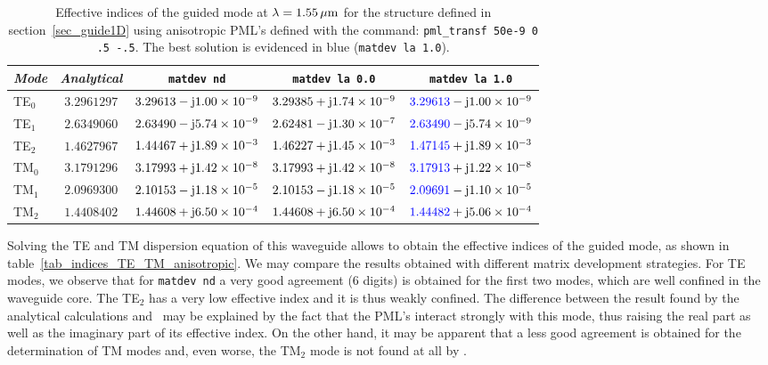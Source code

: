 \begin{table}
{\scriptsize
\begin{tabular}{lcccc}
\hline
\textit{Mode}   & \textit{Analytical}   & \lstinline!matdev nd! & \lstinline!matdev la 0.0! & \lstinline!matdev la 1.0! \\
\hline
TE$_0$ & $3.2961297$ & $3.29613-\mathrm{j} 1.00\times 10^{-9}$ & $3.29385+\mathrm{j} 1.74\times 10^{-9}$ & ${\color{blue}3.29613}-\mathrm{j} 1.00\times 10^{-9}$ \\
TE$_1$ & $2.6349060$ & $2.63490-\mathrm{j} 5.74\times 10^{-9}$ & $2.62481-\mathrm{j} 1.30\times 10^{-7}$ & ${\color{blue}2.63490}-\mathrm{j} 5.74\times 10^{-9}$ \\
TE$_2$ & $1.4627967$ & $1.44467+\mathrm{j} 1.89\times 10^{-3}$ & $1.46227+\mathrm{j} 1.45\times 10^{-3}$ & ${\color{blue}1.47145}+\mathrm{j} 1.89\times 10^{-3}$ \\
\hline
TM$_0$ & $3.1791296$ & $3.17993+\mathrm{j} 1.42\times 10^{-8}$ & $3.17993+\mathrm{j} 1.42\times 10^{-8}$ & ${\color{blue}3.17913}+\mathrm{j} 1.22\times 10^{-8}$ \\
TM$_1$ & $2.0969300$ & $2.10153-\mathrm{j} 1.18\times 10^{-5}$ & $2.10153-\mathrm{j} 1.18\times 10^{-5}$ & ${\color{blue}2.09691}-\mathrm{j} 1.10\times 10^{-5}$ \\
TM$_2$ & $1.4408402$ & $1.44608+\mathrm{j} 6.50\times 10^{-4}$  & $1.44608+\mathrm{j} 6.50\times 10^{-4}$ & ${\color{blue}1.44482}+\mathrm{j} 5.06\times 10^{-4}$ \\
\hline
\end{tabular}}
\caption{Effective indices of the guided mode at $\lambda=1.55\,\mathrm{\mu m}$ for the structure defined in section~\ref{sec_guide1D} using anisotropic PML's defined with the command: \lstinline!pml_transf 50e-9 0 .5 -.5!. The best solution is evidenced in blue (\lstinline!matdev la 1.0!).}
\label{tab_indices_TE_TM_transform}
\end{table}

Solving the TE and TM dispersion equation of this waveguide allows to obtain the effective indices of the guided mode, as shown in table~\ref{tab_indices_TE_TM_anisotropic}.
We may compare the results obtained with different matrix development strategies. For TE modes, we observe that for \lstinline!matdev nd!  a very good agreement (6 digits) is obtained for the first two modes, which are well confined in the waveguide core. The TE$_2$ has a very low effective index and it is thus weakly confined. The difference between the result found by the analytical calculations and \afmm\ may be explained by the fact that the PML's interact strongly with this mode, thus raising the real part as well as the imaginary part of its effective index.
On the other hand, it may be apparent that a less good agreement is obtained for the determination of TM modes and, even worse, the TM$_2$ mode is not found at all by \afmm .

